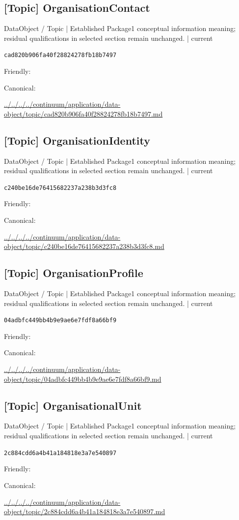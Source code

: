 \documentclass[10pt,a4paper]{article}
\begin{document}
\subsection*{[Topic] OrganisationContact}
{\small DataObject / Topic | Established Package1 conceptual information meaning; residual qualifications in selected section remain unchanged. | current}\par
\texttt{cad820b906fa40f28824278fb18b7497}\par
Friendly: \par
Canonical: \par
{\footnotesize\url{../../../../continuum/application/data-object/topic/cad820b906fa40f28824278fb18b7497.md}}\par
\subsection*{[Topic] OrganisationIdentity}
{\small DataObject / Topic | Established Package1 conceptual information meaning; residual qualifications in selected section remain unchanged. | current}\par
\texttt{c240be16de76415682237a238b3d3fc8}\par
Friendly: \par
Canonical: \par
{\footnotesize\url{../../../../continuum/application/data-object/topic/c240be16de76415682237a238b3d3fc8.md}}\par
\subsection*{[Topic] OrganisationProfile}
{\small DataObject / Topic | Established Package1 conceptual information meaning; residual qualifications in selected section remain unchanged. | current}\par
\texttt{04adbfc449bb4b9e9ae6e7fdf8a66bf9}\par
Friendly: \par
Canonical: \par
{\footnotesize\url{../../../../continuum/application/data-object/topic/04adbfc449bb4b9e9ae6e7fdf8a66bf9.md}}\par
\subsection*{[Topic] OrganisationalUnit}
{\small DataObject / Topic | Established Package1 conceptual information meaning; residual qualifications in selected section remain unchanged. | current}\par
\texttt{2c884cdd6a4b41a184818e3a7e540897}\par
Friendly: \par
Canonical: \par
{\footnotesize\url{../../../../continuum/application/data-object/topic/2c884cdd6a4b41a184818e3a7e540897.md}}\par
\end{document}
